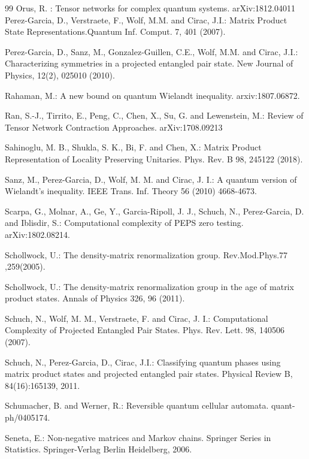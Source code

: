 \documentclass[smallextended]{svjour3}
\renewcommand{\1}{\mathbbm{1}}
\begin{document}
\begin{thebibliography}{99}
     Orus,  R. : Tensor networks for complex quantum systems. arXiv:1812.04011
      Perez-Garcia, D., Verstraete,  F., Wolf,  M.M. and Cirac, J.I.: Matrix Product State Representations.Quantum Inf. Comput. 7, 401 (2007).

      Perez-Garcia, D., Sanz, M.,  Gonzalez-Guillen, C.E., Wolf, M.M. and  Cirac, J.I.: Characterizing symmetries in a projected entangled pair state. New Journal of Physics, 12(2), 025010 (2010).


     Rahaman,  M.: A new bound on quantum Wielandt inequality. arxiv:1807.06872.

     Ran, S.-J.,  Tirrito, E.,  Peng, C.,  Chen, X., Su, G. and  Lewenstein, M.: Review of Tensor Network Contraction Approaches. arXiv:1708.09213

     Sahinoglu, M. B., Shukla, S. K.,  Bi, F. and Chen, X.: Matrix Product Representation of Locality Preserving Unitaries. Phys. Rev. B 98, 245122 (2018).

     Sanz, M.,  Perez-Garcia, D.,  Wolf, M. M. and Cirac, J. I.: A quantum version of Wielandt's inequality. IEEE Trans. Inf. Theory 56 (2010) 4668-4673.

     Scarpa, G.,  Molnar, A.,  Ge, Y.,  Garcia-Ripoll, J. J.,  Schuch, N., Perez-Garcia,   D. and Iblisdir, S.: Computational complexity of PEPS zero testing. arXiv:1802.08214.

     Schollwock, U.: The density-matrix renormalization group. Rev.Mod.Phys.77 ,259(2005).

     Schollwock, U.: The density-matrix renormalization group in the age of matrix product states. Annals of Physics 326, 96 (2011).

     Schuch, N.,  Wolf, M. M.,  Verstraete, F. and Cirac, J. I.:  Computational Complexity of Projected Entangled Pair States. Phys. Rev. Lett. 98, 140506 (2007).

     Schuch, N.,  Perez-Garcia, D., Cirac, J.I.: Classifying quantum phases using matrix product states and projected entangled pair states. Physical Review B, 84(16):165139, 2011.

     Schumacher, B.  and  Werner, R.: Reversible quantum cellular automata. quant-ph/0405174.

      Seneta, E.: Non-negative matrices and Markov chains. Springer Series in Statistics. Springer-Verlag Berlin Heidelberg, 2006.


\end{thebibliography}
\end{document}
